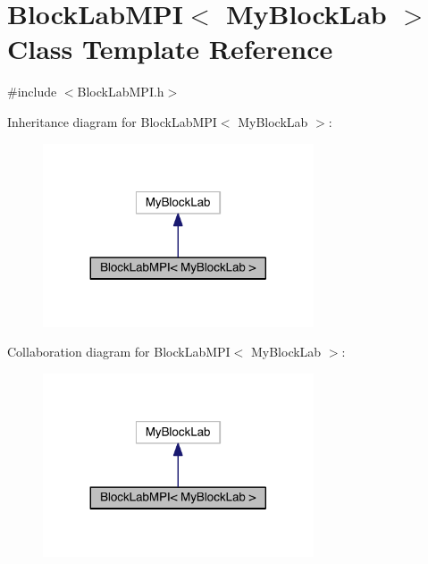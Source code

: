 \hypertarget{class_block_lab_m_p_i}{}\section{Block\+Lab\+M\+P\+I$<$ My\+Block\+Lab $>$ Class Template Reference}
\label{class_block_lab_m_p_i}


{\ttfamily \#include $<$Block\+Lab\+M\+P\+I.\+h$>$}



Inheritance diagram for Block\+Lab\+M\+P\+I$<$ My\+Block\+Lab $>$\+:\nopagebreak
\begin{figure}[H]
\begin{center}
\leavevmode
\includegraphics[width=227pt]{da/d98/class_block_lab_m_p_i__inherit__graph}
\end{center}
\end{figure}


Collaboration diagram for Block\+Lab\+M\+P\+I$<$ My\+Block\+Lab $>$\+:\nopagebreak
\begin{figure}[H]
\begin{center}
\leavevmode
\includegraphics[width=227pt]{df/d42/class_block_lab_m_p_i__coll__graph}
\end{center}
\end{figure}
